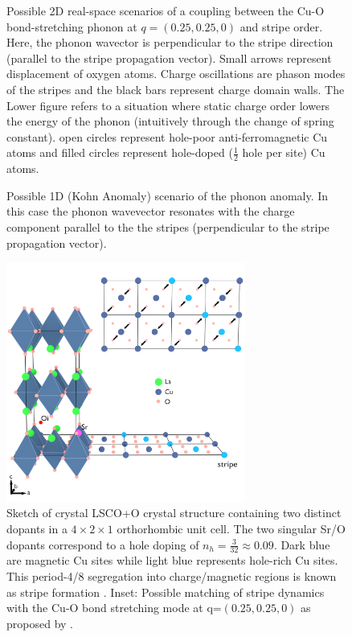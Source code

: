 \begin{figure}
    \centering
    
    \caption[2D phonon anomaly sketch]{Possible 2D real-space scenarios of a coupling between the Cu-O bond-stretching phonon at $q=(0.25,0.25,0)$ and stripe order. Here, the phonon wavector is perpendicular to the stripe direction (parallel to the stripe propagation vector). Small arrows represent displacement of oxygen atoms. Charge oscillations are phason modes of the stripes and the black bars represent charge domain walls. The Lower figure refers to a situation where static charge order lowers the energy of the phonon (intuitively through the change of spring constant). open circles represent hole-poor anti-ferromagnetic Cu atoms and filled circles represent hole-doped ($\frac{1}{2}$ hole per site) Cu atoms.}
    \label{fig:anomaly_1d}
\end{figure}

\begin{figure}
    \centering
    
    \caption[1D phonon anomaly sketch]{Possible 1D (Kohn Anomaly) scenario of the phonon anomaly. In this case the phonon wavevector resonates with the charge component parallel to the the stripes (perpendicular to the stripe propagation vector).}
    \label{fig:anomaly_2d}
\end{figure}

\begin{figure}
    \centering
    \includegraphics[width=0.7\textwidth]{fig/anomaly/overview.png}
    \caption[Crystal structure annotated with phonon at (0.25,0.25,0) and stripe order]{Sketch of crystal LSCO+O crystal structure containing two distinct dopants in a $4 \times 2 \times 1$ orthorhombic unit cell. The two singular Sr/O dopants correspond to a hole doping of $n_h = \frac{3}{32} \approx 0.09$. Dark blue are magnetic Cu sites while light blue represents hole-rich Cu sites. This period-4/8 segregation into charge/magnetic regions is known as stripe formation \cite{Tranquada1995}. Inset: Possible matching of stripe dynamics with the Cu-O bond stretching mode at q=$(0.25,0.25,0)$ as proposed by \citeauthor{Kaneshita2002} \cite{Kaneshita2002}.}
    \label{fig:crystal_anomaly}
\end{figure}

